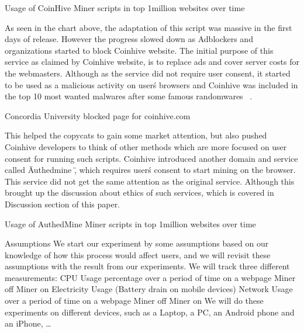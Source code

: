  
\begin{center}
	\caption{Usage of CoinHive Miner scripts in top 1million websites over time}
\end{center}

As seen in the chart above, the adaptation of this script was massive in the first days of release. However the progress slowed down as Adblockers and organizations started to block Coinhive website. The initial purpose of this service as claimed by Coinhive website, is to replace ads and cover server costs for the webmasters. Although as the service did not require user consent, it started to be used as a malicious activity on user\' s browsers and Coinhive was included in the top 10 most wanted malwares after some famous randomwares ~\cite{checkpoint}. 

\begin{center}
	\caption{Concordia University blocked page for coinhive.com}
\end{center}

This helped the copycats to gain some market attention, but also pushed Coinhive developers to think of other methods which are more focused on user consent for running such scripts. Coinhive introduced another domain and service called \" Authedmine \", which requires user\' s consent to start mining on the browser. This service did not get the same attention as the original service. Although this brought up the discussion about ethics of such services, which is covered in Discussion section of this paper. 

\begin{center}
	\caption{Usage of AuthedMine Miner scripts in top 1million websites over time}
\end{center}



Assumptions
	We start our experiment by some assumptions based on our knowledge of how this process would affect users, and we will revisit these assumptions with the result from our experiments.
We will track three different measurements:
CPU Usage percentage over a period of time on a webpage
Miner off
Miner on
Electricity Usage (Battery drain on mobile devices)
Network Usage over a period of time on a webpage
Miner off
Miner on
We will do these experiments on different devices, such as a Laptop, a PC, an Android phone and an iPhone, …


